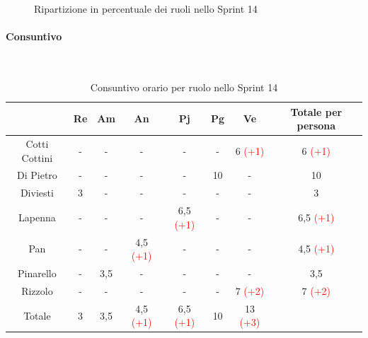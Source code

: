 \documentclass{article}
\begin{document}
                \begin{figure}[H]
                    \centering
                    \caption{Ripartizione in percentuale dei ruoli nello Sprint 14}
                \end{figure}


                \paragraph{Consuntivo}\mbox{}\\
                \begin{table}[H]
                    \centering
                    \begin{tabular}{|c|c|c|c|c|c|c|c|}
                    \hline
                                  & Re  & Am  & An  & Pj  & Pg  & Ve  & Totale per persona \\ \hline
                    Cotti Cottini & -   & -   & -   & -   & -   & 6 \textcolor{red}{(+1)}   & 6 \textcolor{red}{(+1)}                  \\ \hline
                    Di Pietro     & -   & -   & -   & -   & 10  & -   & 10                 \\ \hline
                    Diviesti      & 3   & -   & -   & -   & -   & -   & 3                  \\ \hline
                    Lapenna       & -   & -   & -   & 6,5 \textcolor{red}{(+1)} & -   & -   & 6,5 \textcolor{red}{(+1)}               \\ \hline
                    Pan           & -   & -   & 4,5 \textcolor{red}{(+1)} & -   & -   & -   & 4,5 \textcolor{red}{(+1)}               \\ \hline
                    Pinarello     & -   & 3,5 & -   & -   & -   & -   & 3,5                \\ \hline
                    Rizzolo       & -   & -   & -   & -   & -   & 7 \textcolor{red}{(+2)}   & 7 \textcolor{red}{(+2)}                  \\ \hline
                    Totale        & 3   & 3,5 & 4,5 \textcolor{red}{(+1)} & 6,5 \textcolor{red}{(+1)} & 10  & 13 \textcolor{red}{(+3)}  &                    \\ \hline
                    \end{tabular}
                    \caption{Consuntivo orario per ruolo nello Sprint 14}
                \end{table}
\end{document}

